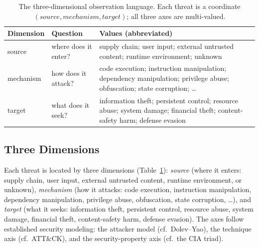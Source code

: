 \documentclass[sigconf,nonacm]{acmart}
\begin{document}
\begin{table}[t]
\caption{The three-dimensional observation language. Each threat is a coordinate $(source, mechanism, target)$; all three axes are multi-valued.}
\label{tab:dims}
\small
\begin{tabular}{@{}p{1.2cm}p{1.9cm}p{4.6cm}@{}}
\toprule
Dimension & Question & Values (abbreviated) \\
\midrule
source & where does it enter? & supply chain; user input; external untrusted content; runtime environment; unknown \\
mechanism & how does it attack? & code execution; instruction manipulation; dependency manipulation; privilege abuse; obfuscation; state corruption; \ldots \\
target & what does it seek? & information theft; persistent control; resource abuse; system damage; financial theft; content-safety harm; defense evasion \\
\bottomrule
\end{tabular}
\end{table}

\subsection{Three Dimensions}
Each threat is located by three dimensions (Table~\ref{tab:dims}): \emph{source} (where it enters: supply chain, user input, external untrusted content, runtime environment, or unknown), \emph{mechanism} (how it attacks: code execution, instruction manipulation, dependency manipulation, privilege abuse, obfuscation, state corruption, \ldots), and \emph{target} (what it seeks: information theft, persistent control, resource abuse, system damage, financial theft, content-safety harm, defense evasion). The axes follow established security modeling: the attacker model (cf.\ Dolev--Yao), the technique axis (cf.\ ATT\&CK), and the security-property axis (cf.\ the CIA triad).
\end{document}
